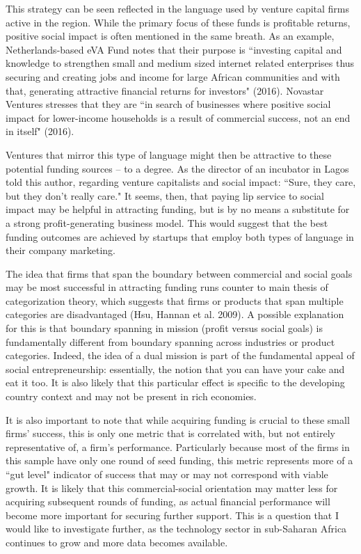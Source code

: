 \documentclass[12pt]{article}
\begin{document}
This strategy can be seen reflected in the language used by venture capital firms active in the region. While the primary focus of these funds is profitable returns, positive social impact is often mentioned in the same breath. As an example, Netherlands-based eVA Fund notes that their purpose is ``investing capital and knowledge to strengthen small and medium sized internet related enterprises thus securing and creating jobs and income for large African communities and with that, generating attractive financial returns for investors" (2016). Novastar Ventures stresses that they are ``in search of businesses where positive social impact for lower-income households is a result of commercial success, not an end in itself" (2016). 

Ventures that mirror this type of language might then be attractive to these potential funding sources -- to a degree. As the director of an incubator in Lagos told this author, regarding venture capitalists and social impact: ``Sure, they care, but they don’t really care." It seems, then, that paying lip service to social impact may be helpful in attracting funding, but is by no means a substitute for a strong profit-generating business model. This would suggest that the best funding outcomes are achieved by startups that employ both types of language in their company marketing. 

The idea that firms that span the boundary between commercial and social goals may be most successful in attracting funding runs counter to main thesis of categorization theory, which suggests that firms or products that span multiple categories are disadvantaged (Hsu, Hannan et al. 2009). A possible explanation for this is that boundary spanning in mission (profit versus social goals) is fundamentally different from boundary spanning across industries or product categories. Indeed, the idea of a dual mission is part of the fundamental appeal of social entrepreneurship: essentially, the notion that you can have your cake and eat it too. It is also likely that this particular effect is specific to the developing country context and may not be present in rich economies.

It is also important to note that while acquiring funding is crucial to these small firms’ success, this is only one metric that is correlated with, but not entirely representative of, a firm’s performance. Particularly because most of the firms in this sample have only one round of seed funding, this metric represents more of a ``gut level" indicator of success that may or may not correspond with viable growth. It is likely that this commercial-social orientation may matter less for acquiring subsequent rounds of funding, as actual financial performance will become more important for securing further support. This is a question that I would like to investigate further, as the technology sector in sub-Saharan Africa continues to grow and more data becomes available.
\end{document}
